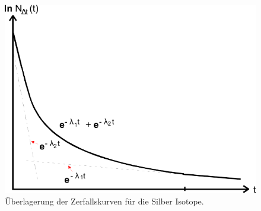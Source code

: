 \begin{figure}
    \centering
    \includegraphics{Abbildungen/Zerfallskurven.pdf}
    \caption{Überlagerung der Zerfallskurven für die Silber Isotope. \cite[vgl.]{man:v702}}
    \label{fig:teo_e-funktionen-krampf}
\end{figure}


